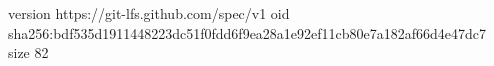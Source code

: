 version https://git-lfs.github.com/spec/v1
oid sha256:bdf535d1911448223dc51f0fdd6f9ea28a1e92ef11cb80e7a182af66d4e47dc7
size 82
